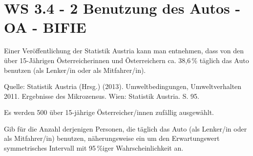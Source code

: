 \section{WS 3.4 - 2 Benutzung des Autos - OA - BIFIE}

\begin{beispiel}[WS 3.4]{1} %
Einer Veröffentlichung der Statistik Austria kann man entnehmen, dass von den
über 15-Jährigen Österreicherinnen und Österreichern ca. 38,6\,\% täglich das Auto benutzen
(als Lenker/in oder als Mitfahrer/in). 

\tiny
\singlespacing
\begin{flushright}
 Quelle: Statistik Austria (Hrsg.) (2013). Umweltbedingungen, Umweltverhalten 2011. Ergebnisse des Mikrozensus. Wien: Statistik Austria. S. 95.
\end{flushright}

\onehalfspacing 
\normalsize

\leer

Es werden 500 über 15-jährige Österreicher/innen zufällig ausgewählt. \leer

Gib für die Anzahl derjenigen Personen, die täglich das Auto (als Lenker/in oder als
Mitfahrer/in) benutzen, näherungsweise ein um den Erwartungswert symmetrisches Intervall mit
95\,\%iger Wahrscheinlichkeit an. 


\end{beispiel} 